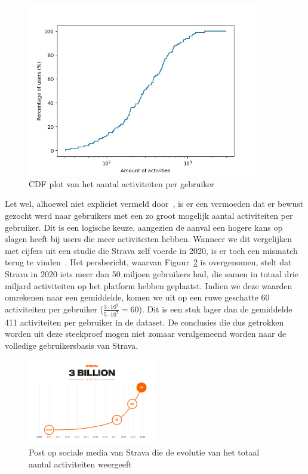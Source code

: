 \begin{figure}[h]
    \centering
    \includegraphics[width=0.9\textwidth]{fig/Afwijkingen&Analyses/CDF_amountActivities.jpg}
    \caption{\ac{CDF} plot van het aantal activiteiten per gebruiker}\label{fig:cdf_amount_activities}
\end{figure}

Let wel, alhoewel niet expliciet vermeld
door~\citeauthor{Dhondt_Pochat_Voulimeneas_Joosen_Volckaert_2022}, is er een
vermoeden dat er bewust gezocht werd naar gebruikers met een zo groot mogelijk
aantal activiteiten per gebruiker. Dit is een logische keuze, aangezien de
aanval een hogere kans op slagen heeft bij users die meer activiteiten hebben.
Wanneer we dit vergelijken met cijfers uit een studie die Strava zelf voerde in
2020, is er toch een mismatch terug te vinden~\cite{StravaMi72:online}. Het
persbericht, waarvan Figuur~\ref{fig:3billionUsers} is overgenomen, stelt dat
Strava in 2020 iets meer dan 50 miljoen gebruikers had, die samen in totaal
drie miljard activiteiten op het platform hebben geplaatst. Indien we deze
waarden omrekenen naar een gemiddelde, komen we uit op een ruwe geschatte 60
activiteiten per gebruiker ($\frac{3 \cdot 10^9}{5 \cdot 10^7} = 60 $). Dit is
een stuk lager dan de gemiddelde 411 activiteiten per gebruiker in de dataset.
De conclusies die dus getrokken worden uit deze steekproef mogen niet zomaar
veralgemeend worden naar de volledige gebruikersbasis van Strava.
\begin{figure}[H]
    \centering
    \includegraphics[width=0.5\textwidth]{fig/Strava_3billion.png}
    \caption{Post op sociale media van Strava die de evolutie van het totaal aantal activiteiten weergeeft~\cite{StravaMi72:online}}\label{fig:3billionUsers}
\end{figure}

